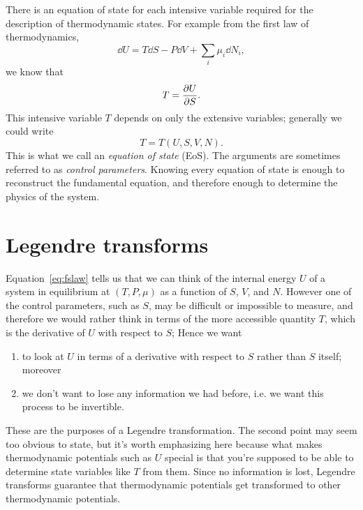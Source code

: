 There is an equation of state for each intensive variable required for the
description of thermodynamic states. For example from the
first law of thermodynamics,
\begin{equation}\label{eq:fslaw}
  \dd{U}=T\dd{S}-P\dd{V}+\sum_i\mu_i\dd{N}_i,
\end{equation}
we know that
\begin{equation}
  T=\pdv{U}{S}.
\end{equation}
This intensive variable $T$ depends on only the extensive variables; 
generally we could write
\begin{equation}
  T=T(U,S,V,N).
\end{equation}
This is what we call an {\it equation of state}
(EoS). The arguments are sometimes referred to as 
{\it control parameters}. Knowing every equation 
of state is enough to reconstruct the fundamental equation, and therefore 
enough to determine the physics of the system.

\section{Legendre transforms}

Equation~\eqref{eq:fslaw} tells us that we can think of the internal energy
$U$ of a system in equilibrium at $(T,P,\mu)$ as a function of $S$, $V$, and
$N$. However one of the control parameters, such as $S$, may be
difficult or impossible to measure, and therefore we would rather
think in terms of the more accessible quantity $T$, which 
is the derivative of $U$ with respect to $S$; 
Hence we want 
\begin{enumerate}
\item to look at $U$ in terms of a derivative with respect to $S$ rather 
      than $S$ itself; moreover 
\item we don't want to lose any information we had before, i.e. we want this
      process to be invertible. 
\end{enumerate}
These are the purposes of a Legendre transformation. The second point 
may seem too obvious to state, but it's worth emphasizing here because 
what makes thermodynamic potentials such as $U$ special is that you're 
supposed to be able to determine state variables like $T$ from them. 
Since no information is lost, Legendre transforms guarantee that 
thermodynamic potentials get transformed to other thermodynamic potentials.

